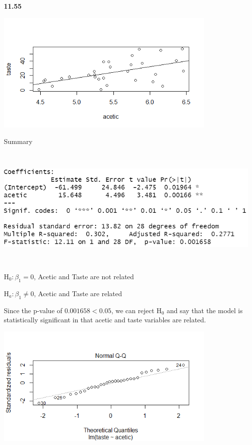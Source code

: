 \documentclass[12pt]{article}
\renewcommand\part[1]{\vspace{.10in}\textbf{#1}\par}
\begin{document}
\newpage
\part{11.55}
	\begin{center}
	\includegraphics[width=.5\textwidth, height=60mm, keepaspectratio]{images/1155/1155_acetic_taste_linreg.png}\par
	
	Summary\par
	\includegraphics[width=.5\textwidth, height=60mm, keepaspectratio]{images/1155/1155_acetic_taste_summary.PNG}\par
	H$_{0}: \beta_{1} = 0$, Acetic and Taste are not related\par
	H$_{a}: \beta_{1} \ne 0$, Acetic and Taste are related \par
	Since the p-value of $ 0.001658 < 0.05$, we can reject H$_{0}$ and say that the model is statistically significant in that acetic and taste variables are related.\par
	
	\includegraphics[width=.5\textwidth, height=60mm, keepaspectratio]{images/1155/1155qq.png}\par
	

\end{center}
\end{document}
